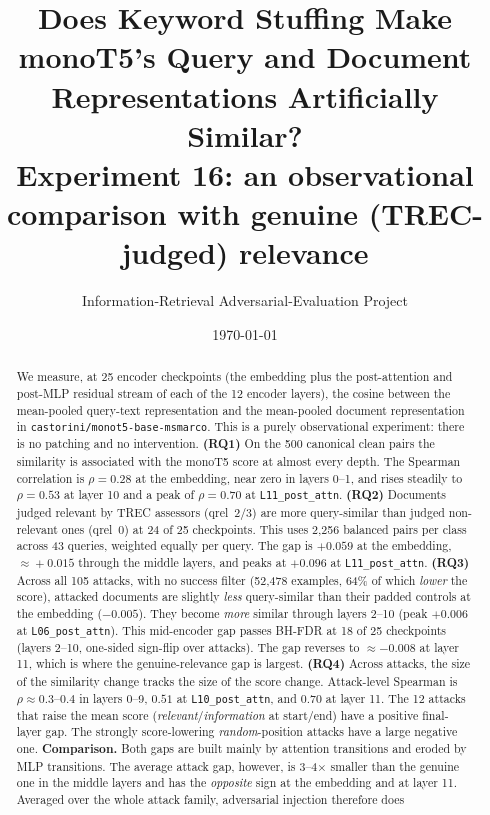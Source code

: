 \documentclass[11pt]{article}
\title{\textbf{Does Keyword Stuffing Make monoT5's Query and Document \\[2pt]
Representations Artificially Similar?} \\[6pt]
\large Experiment 16: an observational comparison with genuine (TREC-judged) relevance}
\author{Information-Retrieval Adversarial-Evaluation Project}
\date{\today}
\begin{document}
\maketitle

\begin{abstract}
We measure, at 25 encoder checkpoints (the embedding plus the post-attention and post-MLP
residual stream of each of the 12 encoder layers), the cosine between the mean-pooled
query-text representation and the mean-pooled document representation in
\texttt{castorini/monot5-base-msmarco}. This is a purely observational experiment:
there is no patching and no intervention. \textbf{(RQ1)} On the 500 canonical clean pairs
the similarity is associated with the monoT5 score at almost every depth. The Spearman
correlation is $\rho=0.28$ at the embedding, near zero in layers 0--1, and rises
steadily to $\rho=0.53$ at layer 10 and a peak of $\rho=0.70$ at \texttt{L11\_post\_attn}.
\textbf{(RQ2)} Documents judged relevant by TREC assessors (qrel~2/3) are more
query-similar than judged non-relevant ones (qrel~0) at 24 of 25 checkpoints. This uses
2,256 balanced pairs per class across 43 queries, weighted equally per query. The gap is
$+0.059$ at the embedding, $\approx\!+0.015$ through the middle layers, and peaks at
$+0.096$ at \texttt{L11\_post\_attn}. \textbf{(RQ3)} Across all 105 attacks, with no
success filter (52,478 examples, 64\% of which \emph{lower} the score), attacked
documents are slightly \emph{less} query-similar than their padded controls at the
embedding ($-0.005$). They become \emph{more} similar through layers 2--10 (peak
$+0.006$ at \texttt{L06\_post\_attn}). This mid-encoder gap passes BH-FDR at 18 of 25
checkpoints (layers 2--10, one-sided sign-flip over attacks). The gap reverses to
$\approx-0.008$ at layer 11, which is where the genuine-relevance gap is largest.
\textbf{(RQ4)} Across attacks, the size of the similarity change tracks the size of the
score change. Attack-level Spearman is $\rho\approx0.3$--$0.4$ in layers 0--9, $0.51$
at \texttt{L10\_post\_attn}, and $0.70$ at layer 11. The 12 attacks that raise the mean
score (\emph{relevant}/\emph{information} at start/end) have a positive final-layer gap.
The strongly score-lowering \emph{random}-position attacks have a large negative one.
\textbf{Comparison.} Both gaps are built mainly by attention transitions and eroded by MLP
transitions. The average attack gap, however, is 3--4$\times$ smaller than the genuine
one in the middle layers and has the \emph{opposite} sign at the embedding and at
layer 11. Averaged over the whole attack family, adversarial injection therefore does

\end{abstract}
\end{document}
